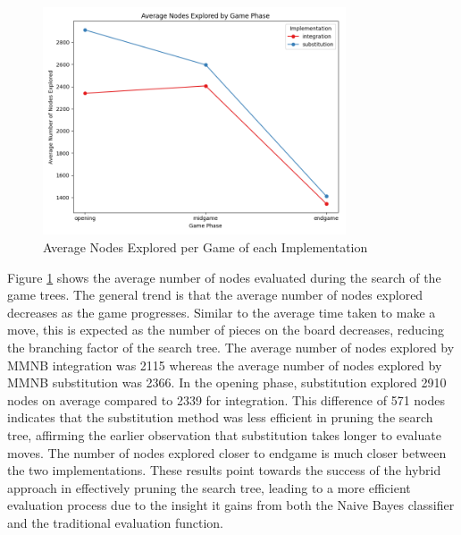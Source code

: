 \begin{figure}[H]
    \centering
    \includegraphics[width=0.8\textwidth]{images/plots/implementation/Implementation_vs_avg_nodes_explored_and_phase.png}
    \caption{Average Nodes Explored per Game of each Implementation}
    \label{fig: implementation_vs_avg_nodes_explored_and_phase}
\end{figure}


Figure \ref{fig: implementation_vs_avg_nodes_explored_and_phase} shows the average number of nodes evaluated during the search of the game trees. The general trend is that the average number of nodes explored decreases as the game progresses. Similar to the average time taken to make a move, this is expected as the number of pieces on the board decreases, reducing the branching factor of the search tree. The average number of nodes explored by MMNB integration was 2115 whereas the average number of nodes explored by MMNB substitution was 2366. In the opening phase, substitution explored 2910 nodes on average compared to 2339 for integration. This difference of 571 nodes indicates that the substitution method was less efficient in pruning the search tree, affirming the earlier observation that substitution takes longer to evaluate moves. The number of nodes explored closer to endgame is much closer between the two implementations. These results point towards the success of the hybrid approach in effectively pruning the search tree, leading to a more efficient evaluation process due to the insight it gains from both the Naive Bayes classifier and the traditional evaluation function. 

